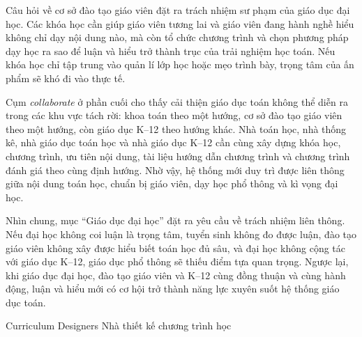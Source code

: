 {{    Câu hỏi về cơ sở đào tạo giáo viên đặt ra trách nhiệm sư phạm của giáo dục đại học. Các khóa học cần giúp giáo viên tương lai và giáo viên đang hành nghề hiểu không chỉ dạy nội dung nào, mà còn tổ chức chương trình và chọn phương pháp dạy học ra sao để luận và hiểu trở thành trục của trải nghiệm học toán. Nếu khóa học chỉ tập trung vào quản lí lớp học hoặc mẹo trình bày, trọng tâm của ấn phẩm sẽ khó đi vào thực tế.

    Cụm \emph{collaborate} ở phần cuối cho thấy cải thiện giáo dục toán không thể diễn ra trong các khu vực tách rời: khoa toán theo một hướng, cơ sở đào tạo giáo viên theo một hướng, còn giáo dục K--12 theo hướng khác. Nhà toán học, nhà thống kê, nhà giáo dục toán học và nhà giáo dục K--12 cần cùng xây dựng khóa học, chương trình, ưu tiên nội dung, tài liệu hướng dẫn chương trình và chương trình đánh giá theo cùng định hướng. Nhờ vậy, hệ thống mới duy trì được liên thông giữa nội dung toán học, chuẩn bị giáo viên, dạy học phổ thông và kì vọng đại học.

    Nhìn chung, mục ``Giáo dục đại học'' đặt ra yêu cầu về trách nhiệm liên thông. Nếu đại học không coi luận là trọng tâm, tuyển sinh không đo được luận, đào tạo giáo viên không xây được hiểu biết toán học đủ sâu, và đại học không cộng tác với giáo dục K--12, giáo dục phổ thông sẽ thiếu điểm tựa quan trọng. Ngược lại, khi giáo dục đại học, đào tạo giáo viên và K--12 cùng đồng thuận và cùng hành động, luận và hiểu mới có cơ hội trở thành năng lực xuyên suốt hệ thống giáo dục toán.}
  }

\ParallelSection
  {Curriculum Designers}
  {Nhà thiết kế chương trình học}
  {}

